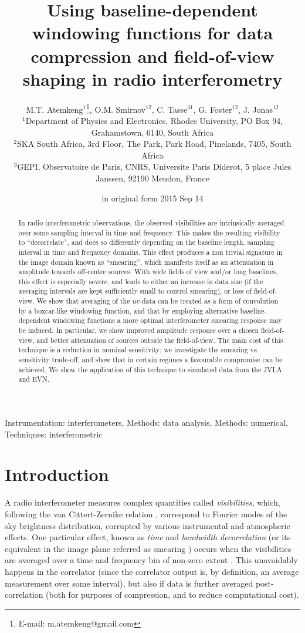 \documentclass[useAMS,usenatbib]{mn2e}
\title[BDWFs for data compression and FoV shaping]{Using baseline-dependent windowing functions 
for data compression and field-of-view shaping in radio interferometry}
\author[M.T. Atemkeng, O.M. Smirnov, C. Tasse, G. Foster and J. Jonas]{M.T. 
Atemkeng$^{1}$\thanks{E-mail: m.atemkeng@gmail.com}, O.M. Smirnov$^{12}$, C. Tasse$^{31}$, G. Foster$^{12}$, J. Jonas$^{12}$ \\
$^1$Department of Physics and Electronics, Rhodes University, PO Box 94, Grahamstown, 6140, South Africa\\
$^2$SKA South Africa, 3rd Floor, The Park, Park Road, Pinelands, 7405, South Africa\\
$^3$GEPI, Observatoire de Paris, CNRS, Universite Paris Diderot, 5 place Jules Janssen, 92190 Meudon, France}
\begin{document}
\date{in original form 2015 Sep 14}

\pagerange{\pageref{firstpage}--\pageref{lastpage}} 

\maketitle

\label{firstpage}

\begin{abstract}


In radio interferometric observations, the observed visibilities are intrinsically averaged over some sampling interval
in time and frequency. 
This makes the resulting visibility to ``decorrelate'', and does so differently depending on the baseline length, sampling interval in  time and frequency domains. This effect produces a non trivial signature in the image domain known as ``smearing'', which manifests itself as an attenuation 
in amplitude towards off-centre sources. With wide fields of view and/or long baselines, this effect is especially severe,
and leads to either an increase in data size (if the averaging intervals are kept sufficiently small to control smearing), or 
loss of field-of-view. We show that averaging of the $uv$-data can be treated as a form of convolution by a boxcar-like 
windowing function, and that by employing alternative baseline-dependent windowing functions a more optimal interferometer 
smearing response may be induced. In particular, we show improved amplitude response over a chosen field-of-view, and 
better attenuation of sources outside the field-of-view. The main cost of this technique is a reduction in nominal 
sensitivity; we investigate the smearing vs. sensitivity trade-off, and show that in certain regimes a favourable 
compromise can be achieved. We show the application of this technique to simulated data from the JVLA and EVN.
\end{abstract}
\begin{keywords}
Instrumentation: interferometers, Methods: data analysis, Methods: numerical, Techniques: interferometric
\end{keywords}

\section[]{Introduction}

A radio interferometer measures complex quantities called \emph{visibilities}, which, following the van Cittert-Zernike 
relation \citep{thompson1999fundamentals,thompson2001fundamentals}, correspond to Fourier modes of the sky brightness distribution, corrupted by various instrumental 
and atmospheric effects. 
One particular effect, known as \emph{time} and \emph{bandwidth decorrelation} (or its equivalent in the image plane referred as smearing ) occurs 
when the visibilities are averaged over a time and frequency bin of non-zero extent \citep{bridle1989wide,bridle1999bandwidth}. This unavoidably happens in the correlator 
(since the correlator output is, by definition, an average measurement over some interval), but also if data is further 
averaged post-correlation (both for purposes of compression, and to reduce computational cost).
\end{document}
